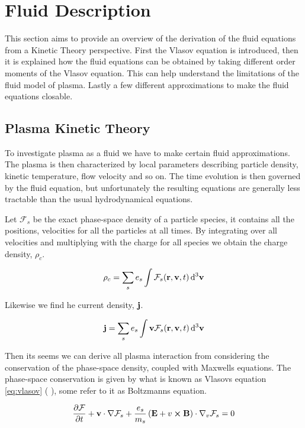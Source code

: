 \section{Fluid Description}
	This section aims to provide an overview of the derivation of the fluid equations
	from a Kinetic Theory perspective. First the Vlasov equation is introduced,
	then it is explained how the fluid equations can be obtained by taking different
	order moments of the Vlasov equation. This can help understand the limitations
	of the fluid model of plasma. Lastly a few different approximations
	to make the fluid equations closable.

\subsection{Plasma Kinetic Theory}

	To investigate plasma as a fluid we have to make certain fluid approximations.
	The plasma is then characterized by local parameters describing particle
	density, kinetic temperature, flow velocity and so on. The time evolution
	is then governed by the fluid equation, but unfortunately the resulting
	equations are generally less tractable than the usual hydrodynamical
	equations.

	Let \(\mathcal{F}_s\) be the exact phase-space density of a particle species,
	it contains all the positions, velocities for all the particles at
	all times. By integrating over all velocities and multiplying with the charge
	for all species we obtain the charge density, \(\rho_c\).

	\[\rho_c = \sum_s e_s \int \mathcal{F}_s(\vb{r},\vb{v},t)\dd[3]{\vb{v}}\]

	Likewise we find he current density, \(\vb{j}\).

	\[\vb{j} = \sum_s e_s \int \vb{v}\mathcal{F}_s(\vb{r},\vb{v},t)\dd[3]{\vb{v}}\]

	Then its seems we can derive all plasma interaction from considering
	the conservation of the phase-space density, coupled with Maxwells equations.
	The phase-space conservation is given by what is known as Vlasovs equation \cref{eq:vlasov}
	(\textit{} \cite{pecseli_waves_2012}), some refer
	to it as Boltzmanns equation.

	\begin{align}
		\pdv{\mathcal{F}}{t} + \vb{v}\cdot\nabla\mathcal{F}_s + \frac{e_s}{m_s}\left( \vb{E} + v\cross\vb{B} \right) \cdot \nabla_v\mathcal{F}_s = 0 \label{eq:vlasov}
	\end{align}

